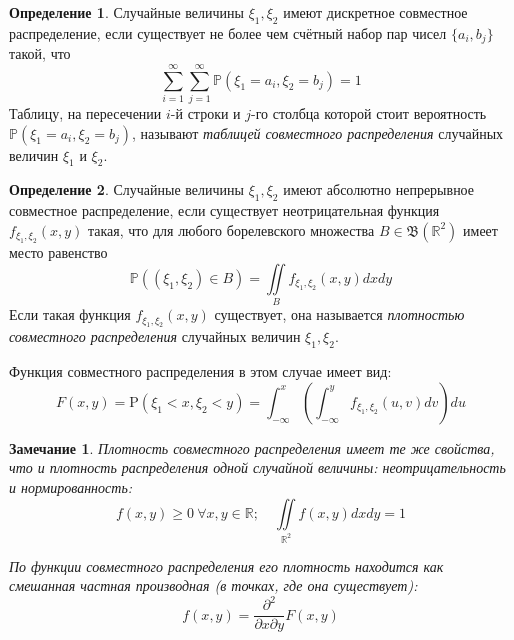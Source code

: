 \documentclass[oneside,final,14pt]{extreport}
\newtheorem*{rmrk}{Замечание}
\theoremstyle{definition}
\newtheorem{defn}{Определение}[section]
\begin{document}
\begin{defn}
    Случайные величины $\xi_1, \xi_2$ имеют дискретное совместное распределение, если существует не более чем счётный набор пар чисел $\{a_{i}, b_{j}\}$ такой, что
    \begin{equation*}
        \sum_{i=1}^{\infty} \sum_{j=1}^{\infty} \mathbb{P}\left(\xi_{1}=a_{i}, \xi_{2}=b_{j}\right)=1
    \end{equation*}
    Таблицу, на пересечении $i$-й строки и $j$-го столбца которой стоит вероятность $\mathbb{P}\left(\xi_{1}=a_{i}, \xi_{2}=b_{j}\right)$, называют {\it таблицей совместного распределения} случайных величин $\xi_1$ и $\xi_2$.
\end{defn}
\begin{defn}
    Случайные величины $\xi_1, \xi_2$ имеют абсолютно непрерывное совместное распределение, если существует неотрицательная функция $f_{\xi_{1}, \xi_{2}}(x, y)$ такая, что для любого борелевского множества $B \in \mathfrak{B}\left(\mathbb{R}^{2}\right)$ имеет место равенство
    \begin{equation*}
        \mathbb{P}\left(\left(\xi_{1}, \xi_{2}\right) \in B\right)=\iint\limits_{B} f_{\xi_{1}, \xi_{2}}(x, y) d x d y
    \end{equation*}
    Если такая функция $f_{\xi_{1}, \xi_{2}}(x, y)$ существует, она называется {\it плотностью совместного распределения} случайных величин $\xi_1, \xi_2$.
    
    Функция совместного распределения в этом случае имеет вид:
    \begin{equation*}
        F(x, y)=\mathrm{P}(\xi_{1}<x, \xi_{2}<y)=\int_{-\infty}^{x}\left(\int_{-\infty}^{y} f_{\xi_{1}, \xi_{2}}(u, v) d v\right) d u
    \end{equation*}
\end{defn}

\begin{rmrk}
    Плотность совместного распределения имеет те же свойства, что и плотность распределения одной случайной величины: неотрицательность и нормированность:
    \begin{equation*}
        f(x, y) \geqslant 0~ \forall x,y \in \mathbb{R}; \quad \iint\limits_{\mathbb{R}^{2}} f(x, y) dx dy = 1
    \end{equation*}

    По функции совместного распределения его плотность находится как смешанная частная производная (в точках, где она существует):
    \begin{equation*}
        f(x, y)=\frac{\partial^{2}}{\partial x \partial y} F(x, y)
    \end{equation*}
\end{rmrk}
\end{document}
